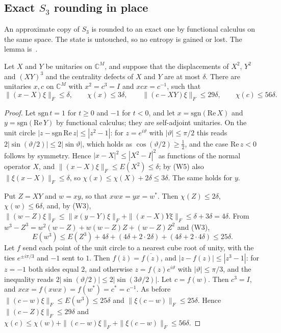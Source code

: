 \subsection{Exact \texorpdfstring{$S_3$}{S3} rounding in place}

An approximate copy of $S_3$ is rounded to an exact one by functional calculus on the same space. The state is untouched, so no entropy is
gained or lost. The lemma is~\cite[Lemma~B.3]{DouglasMghirbiB}.

\begin{lemma}\label{lem:rounding}
Let $X$ and $Y$ be unitaries on $\mathbb C^M$, and suppose that the displacements of $X^2$, $Y^2$ and $(XY)^3$ and the centrality defects of
$X$ and $Y$ are at most $\delta$. There are unitaries $x,c$ on $\mathbb C^M$ with $x^2=c^3=I$ and $xcx=c^{-1}$, such that
\[
\|(x-X)\xi\|_F\le\delta,\qquad\chi(x)\le3\delta,\qquad\|(c-XY)\xi\|_F\le29\delta,\qquad\chi(c)\le56\delta .
\]
\end{lemma}

\begin{proof}
Let $\mathrm{sgn}\,t=1$ for $t\ge0$ and $-1$ for $t<0$, and let $x=\mathrm{sgn}(\mathrm{Re}\,X)$ and $y=\mathrm{sgn}(\mathrm{Re}\,Y)$ by functional calculus;
they are self-adjoint unitaries. On the unit circle $|z-\mathrm{sgn}\,\mathrm{Re}\,z|\le|z^2-1|$: for $z=e^{i\vartheta}$ with $|\vartheta|\le\pi/2$ this reads
$2|\sin(\vartheta/2)|\le2|\sin\vartheta|$, which holds as $\cos(\vartheta/2)\ge\frac12$, and the case $\mathrm{Re}\,z<0$ follows by symmetry. Hence
$|x-X|^2\le|X^2-I|^2$ as functions of the normal operator $X$, and $\|(x-X)\xi\|_F\le E(X^2)\le\delta$; by (W5) also $\|\xi(x-X)\|_F\le\delta$, so
$\chi(x)\le\chi(X)+2\delta\le3\delta$. The same holds for $y$.

Put $Z=XY$ and $w=xy$, so that $xwx=yx=w^*$. Then $\chi(Z)\le2\delta$, $\chi(w)\le6\delta$, and, by (W3),
$\|(w-Z)\xi\|_F\le\|x(y-Y)\xi\|_F+\|(x-X)Y\xi\|_F\le\delta+3\delta=4\delta$. From $w^3-Z^3=w^2(w-Z)+w(w-Z)Z+(w-Z)Z^2$ and (W3),
\[
E(w^3)\le E(Z^3)+4\delta+(4\delta+2\cdot2\delta)+(4\delta+2\cdot4\delta)\le25\delta .
\]
Let $f$ send each point of the unit circle to a nearest cube root of unity, with the ties $e^{\pm i\pi/3}$ and $-1$ sent to $1$. Then
$f(\bar z)=\overline{f(z)}$, and $|z-f(z)|\le|z^3-1|$: for $z=-1$ both sides equal $2$, and otherwise $z=f(z)e^{i\vartheta}$ with
$|\vartheta|\le\pi/3$, and the inequality reads $2|\sin(\vartheta/2)|\le2|\sin(3\vartheta/2)|$. Let $c=f(w)$. Then $c^3=I$, and $xcx=f(xwx)=f(w^*)=c^*=c^{-1}$. As before
$\|(c-w)\xi\|_F\le E(w^3)\le25\delta$ and $\|\xi(c-w)\|_F\le25\delta$. Hence $\|(c-Z)\xi\|_F\le29\delta$ and
$\chi(c)\le\chi(w)+\|(c-w)\xi\|_F+\|\xi(c-w)\|_F\le56\delta$.
\end{proof}

